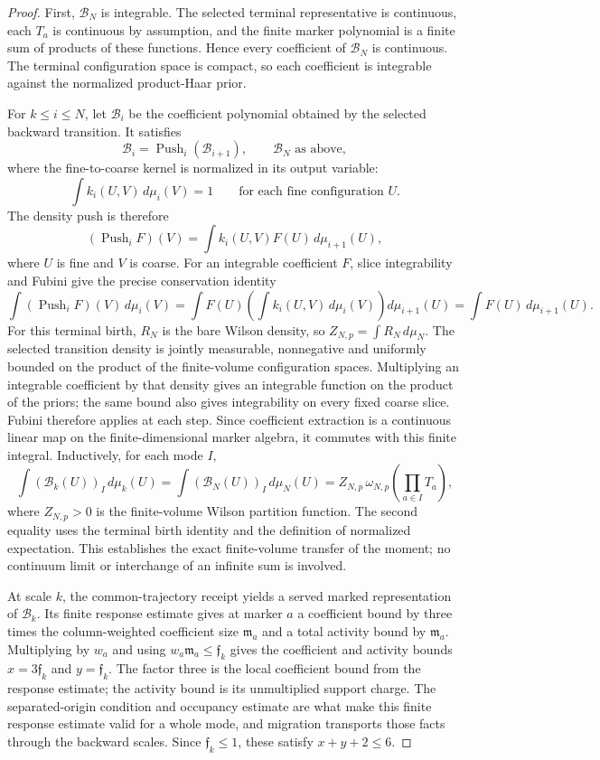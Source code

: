 \begin{proof}
First, $\mathcal B_N$ is integrable. The selected terminal representative is continuous, each $T_a$ is continuous by assumption, and the finite marker polynomial is a finite sum of products of these functions. Hence every coefficient of $\mathcal B_N$ is continuous. The terminal configuration space is compact, so each coefficient is integrable against the normalized product-Haar prior.

For $k\leq i\leq N$, let $\mathcal B_i$ be the coefficient polynomial obtained by the selected backward transition. It satisfies
\[
 \mathcal B_i=\operatorname{Push}_i(\mathcal B_{i+1}),
 \qquad \mathcal B_N\text{ as above},
\]
where the fine-to-coarse kernel is normalized in its output variable:
\[
 \int k_i(U,V)\,d\mu_i(V)=1\qquad\text{for each fine configuration }U.
\]
The density push is therefore
\[
 (\operatorname{Push}_iF)(V)=\int k_i(U,V)F(U)\,d\mu_{i+1}(U),
\]
where $U$ is fine and $V$ is coarse. For an integrable coefficient $F$, slice integrability and Fubini give the precise conservation identity
\[
 \int (\operatorname{Push}_iF)(V)\,d\mu_i(V)
 =\int F(U)\left(\int k_i(U,V)\,d\mu_i(V)\right)d\mu_{i+1}(U)
 =\int F(U)\,d\mu_{i+1}(U).
\]
For this terminal birth, $R_N$ is the bare Wilson density, so $Z_{N,p}=\int R_N\,d\mu_N$. The selected transition density is jointly measurable, nonnegative and uniformly bounded on the product of the finite-volume configuration spaces. Multiplying an integrable coefficient by that density gives an integrable function on the product of the priors; the same bound also gives integrability on every fixed coarse slice. Fubini therefore applies at each step. Since coefficient extraction is a continuous linear map on the finite-dimensional marker algebra, it commutes with this finite integral. Inductively, for each mode $I$,
\begin{equation}
 \int (\mathcal B_k(U))_I\,d\mu_k(U)
 =\int (\mathcal B_N(U))_I\,d\mu_N(U)
 =Z_{N,p}\,\omega_{N,p}\!\left(\prod_{a\in I}T_a\right),
 \label{ex-selected-birth-integral}
\end{equation}
where $Z_{N,p}>0$ is the finite-volume Wilson partition function. The second equality uses the terminal birth identity and the definition of normalized expectation. This establishes the exact finite-volume transfer of the moment; no continuum limit or interchange of an infinite sum is involved.

At scale $k$, the common-trajectory receipt yields a served marked representation of $\mathcal B_k$. Its finite response estimate gives at marker $a$ a coefficient bound by three times the column-weighted coefficient size $\mathfrak m_a$ and a total activity bound by $\mathfrak m_a$. Multiplying by $w_a$ and using $w_a\mathfrak m_a\leq\mathfrak f_k$ gives the coefficient and activity bounds $x=3\mathfrak f_k$ and $y=\mathfrak f_k$. The factor three is the local coefficient bound from the response estimate; the activity bound is its unmultiplied support charge. The separated-origin condition and occupancy estimate are what make this finite response estimate valid for a whole mode, and migration transports those facts through the backward scales. Since $\mathfrak f_k\leq1$, these satisfy $x+y+2\leq6$.


\end{proof}
